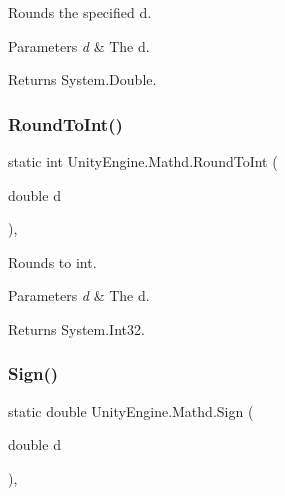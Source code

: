 Rounds the specified d. 


\begin{DoxyParams}{Parameters}
{\em d} & The d.\\
\hline
\end{DoxyParams}
\begin{DoxyReturn}{Returns}
System.\+Double.
\end{DoxyReturn}
\mbox{\label{struct_unity_engine_1_1_mathd_a7cb52a5ced742e497b0d8975ab872dac}} 
\subsubsection{\texorpdfstring{Round\+To\+Int()}{RoundToInt()}}
{\footnotesize\ttfamily static int Unity\+Engine.\+Mathd.\+Round\+To\+Int (\begin{DoxyParamCaption}\item[{double}]{d }\end{DoxyParamCaption})\hspace{0.3cm}{\ttfamily [inline]}, {\ttfamily [static]}}



Rounds to int. 


\begin{DoxyParams}{Parameters}
{\em d} & The d.\\
\hline
\end{DoxyParams}
\begin{DoxyReturn}{Returns}
System.\+Int32.
\end{DoxyReturn}
\mbox{\label{struct_unity_engine_1_1_mathd_a51a1213a287353b368fb7ce9dcad9568}} 
\subsubsection{\texorpdfstring{Sign()}{Sign()}}
{\footnotesize\ttfamily static double Unity\+Engine.\+Mathd.\+Sign (\begin{DoxyParamCaption}\item[{double}]{d }\end{DoxyParamCaption})\hspace{0.3cm}{\ttfamily [inline]}, {\ttfamily [static]}}



